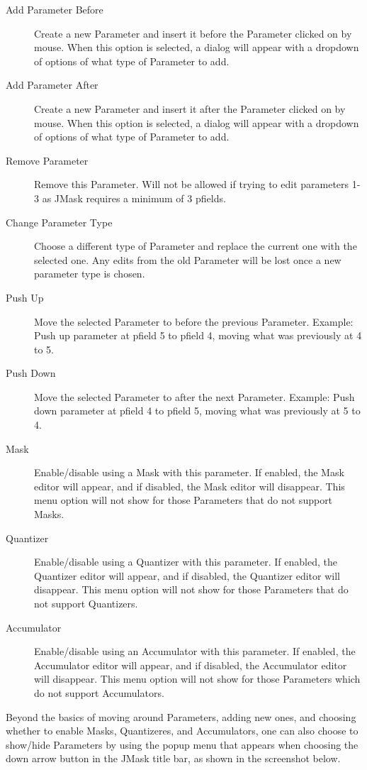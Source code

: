 \begin{description}
\item[Add Parameter Before]
Create a new Parameter and insert it before the Parameter clicked on by
mouse. When this option is selected, a dialog will appear with a
dropdown of options of what type of Parameter to add.
\item[Add Parameter After]
Create a new Parameter and insert it after the Parameter clicked on by
mouse. When this option is selected, a dialog will appear with a
dropdown of options of what type of Parameter to add.
\item[Remove Parameter]
Remove this Parameter. Will not be allowed if trying to edit parameters
1-3 as JMask requires a minimum of 3 pfields.
\item[Change Parameter Type]
Choose a different type of Parameter and replace the current one with
the selected one. Any edits from the old Parameter will be lost once a
new parameter type is chosen.
\item[Push Up]
Move the selected Parameter to before the previous Parameter. Example:
Push up parameter at pfield 5 to pfield 4, moving what was previously at
4 to 5.
\item[Push Down]
Move the selected Parameter to after the next Parameter. Example: Push
down parameter at pfield 4 to pfield 5, moving what was previously at 5
to 4.
\item[Mask]
Enable/disable using a Mask with this parameter. If enabled, the Mask
editor will appear, and if disabled, the Mask editor will disappear.
This menu option will not show for those Parameters that do not support
Masks.
\item[Quantizer]
Enable/disable using a Quantizer with this parameter. If enabled, the
Quantizer editor will appear, and if disabled, the Quantizer editor will
disappear. This menu option will not show for those Parameters that do
not support Quantizers.
\item[Accumulator]
Enable/disable using an Accumulator with this parameter. If enabled, the
Accumulator editor will appear, and if disabled, the Accumulator editor
will disappear. This menu option will not show for those Parameters
which do not support Accumulators.
\end{description}

Beyond the basics of moving around Parameters, adding new ones, and
choosing whether to enable Masks, Quantizeres, and Accumulators, one can
also choose to show/hide Parameters by using the popup menu that appears
when choosing the down arrow button in the JMask title bar, as shown in
the screenshot below.

